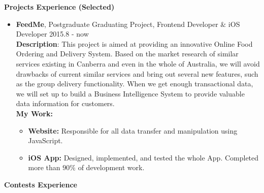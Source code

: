 \documentclass{res}
\newcommand{\resheading}[1]{{\normalsize \colorbox{mygrey}{\begin{minipage}{\textwidth}{\textbf{#1 \vphantom{p\^{E}}}}\end{minipage}}}}
\begin{document}
\begin{resume}
\begin{CJK*}{UTF8}{song}
\resheading{Projects Experience (Selected)}
\begin{itemize}
	\item {\bf FeedMe}, Postgraduate Graduating Project, Frontend Developer $\&$ iOS Developer \hfill 2015.8 - now	\vspace{3pt} \\	
\textbf{Description}: This project is aimed at providing an innovative Online Food Ordering and Delivery System. Based on the market research of similar services existing in Canberra and even in the whole of Australia, we will avoid drawbacks of current similar services and bring out several new features, such as the group delivery functionality. When we get enough transactional data, we will set up to build a Business Intelligence System to provide valuable data information for customers. \vspace{2pt} \\
\textbf{My Work:}
	\begin{itemize}
		\item {\bf Website:} Responsible for all data transfer and manipulation using JavaScript.
		\item {\bf iOS App:} Designed, implemented, and tested the whole App. Completed more than $90\%$ of development work.
	\end{itemize}	
\end{itemize}



\resheading{Contests Experience}

\begin{itemize}


\end{itemize}
\end{CJK*}
\end{resume}
\end{document}
